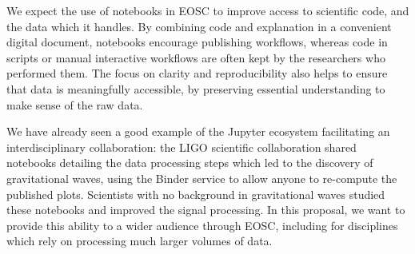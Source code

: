 
We expect the use of notebooks in EOSC to improve access to scientific code,
and the data which it handles. By combining code and explanation in a convenient
digital document, notebooks encourage publishing workflows, whereas code in
scripts or manual interactive workflows are often kept by the researchers who
performed them. The focus on clarity and reproducibility also helps to ensure
that data is meaningfully accessible, by preserving essential understanding to
make sense of the raw data.

We have already seen a good example of the Jupyter ecosystem facilitating an
interdisciplinary collaboration: the LIGO scientific collaboration shared
notebooks detailing the data processing steps which led to the discovery of
gravitational waves, using the Binder service to allow anyone to re-compute
the published plots. Scientists with no background in gravitational waves
studied these notebooks and improved the signal processing.
In this proposal, we want to provide this ability to a wider audience through
EOSC, including for disciplines which rely on processing much larger volumes of
data.



